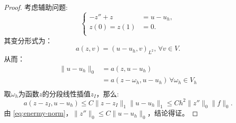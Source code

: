\documentclass[lang=cn,10pt,newtx]{elegantbook}
\newcommand{\norm}[1]{\|#1\|}
\begin{document}
\begin{proof}
  考虑辅助问题:
  \begin{equation}
    \label{eq:auxiliaryProb}
    \left\{
    \begin{aligned}
        -z''+z&=u-u_{h},\\
        z(0)=z(1)&=0.\\
    \end{aligned}
    \right.
  \end{equation}
  其变分形式为：
  \begin{equation}
    a(z,v)=(u-u_{h},v)_{L^{2}},\,\forall v\in V.
  \end{equation}
  从而：
  \begin{equation}
    \begin{aligned}
      \norm{u-u_{h}}_{0}&=a(z,u-u_{h})\\
      &=a(z-\omega_{h},u-u_{h})\,\forall\omega_{h}\in V_{h}\\
    \end{aligned}
  \end{equation}
  取$\omega_{h}$为函数$z$的分段线性插值$z_{I}$，那么:
  \begin{equation}
    a(z-z_{I},u-u_{h})\le C\norm{z-z_{I}}_{1}\norm{u-u_{h}}_{1}\le Ch^{2}\norm{z''}_{0}\norm{f}_{0}.
  \end{equation}
  由 \eqref{eq:enermy-norm}，$\norm{z''}_{0}\le C\norm{u-u_{h}}_{0}$，结论得证。
\end{proof}
\end{document}

